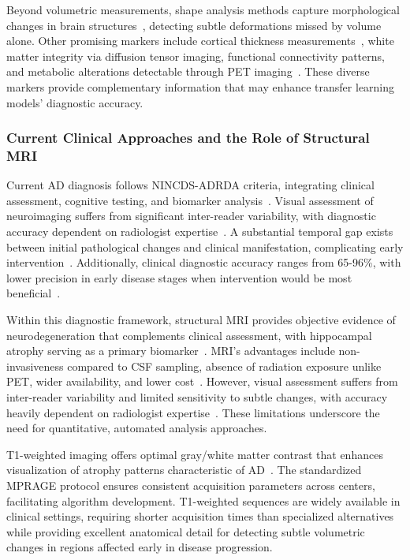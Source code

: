 \documentclass[11pt, a4paper]{article}
\begin{document}
Beyond volumetric measurements, shape analysis methods capture morphological changes in brain structures~\cite{ferrarini2006shape}, detecting subtle deformations missed by volume alone. Other promising markers include cortical thickness measurements~\cite{gutierrez2009patterns}, white matter integrity via diffusion tensor imaging, functional connectivity patterns, and metabolic alterations detectable through PET imaging~\cite{vemuri2010role}. These diverse markers provide complementary information that may enhance transfer learning models' diagnostic accuracy.

\subsubsection{Current Clinical Approaches and the Role of Structural MRI}

Current AD diagnosis follows NINCDS-ADRDA criteria, integrating clinical assessment, cognitive testing, and biomarker analysis~\cite{dubois2007research}. Visual assessment of neuroimaging suffers from significant inter-reader variability, with diagnostic accuracy dependent on radiologist expertise~\cite{cuingnet2011automatic}. A substantial temporal gap exists between initial pathological changes and clinical manifestation, complicating early intervention~\cite{jack2018nia}. Additionally, clinical diagnostic accuracy ranges from 65-96\%, with lower precision in early disease stages when intervention would be most beneficial~\cite{kloppel2008accuracy}.

Within this diagnostic framework, structural MRI provides objective evidence of neurodegeneration that complements clinical assessment, with hippocampal atrophy serving as a primary biomarker~\cite{dubois2007research}. MRI's advantages include non-invasiveness compared to CSF sampling, absence of radiation exposure unlike PET, wider availability, and lower cost~\cite{vemuri2010role}. However, visual assessment suffers from inter-reader variability and limited sensitivity to subtle changes, with accuracy heavily dependent on radiologist expertise~\cite{kloppel2008accuracy}. These limitations underscore the need for quantitative, automated analysis approaches.

T1-weighted imaging offers optimal gray/white matter contrast that enhances visualization of atrophy patterns characteristic of AD~\cite{herrera2013classification}. The standardized MPRAGE protocol ensures consistent acquisition parameters across centers, facilitating algorithm development. T1-weighted sequences are widely available in clinical settings, requiring shorter acquisition times than specialized alternatives while providing excellent anatomical detail for detecting subtle volumetric changes in regions affected early in disease progression.
\end{document}
